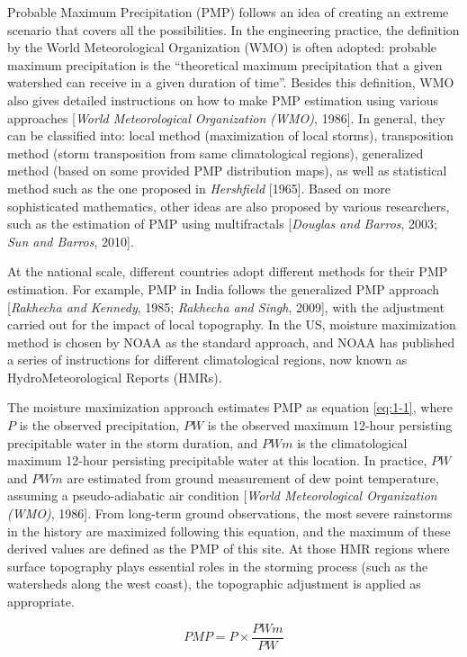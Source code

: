 Probable Maximum Precipitation (PMP) follows an idea of creating an extreme scenario that covers all the possibilities. In the engineering practice, the definition by the World Meteorological Organization (WMO) is often adopted: probable maximum precipitation is the ``theoretical maximum precipitation that a given watershed can receive in a given duration of time''. Besides this definition, WMO also gives detailed instructions on how to make PMP estimation using various approaches [\textit{World Meteorological Organization (WMO)}, 1986]. In general, they can be classified into: local method (maximization of local storms), transposition method (storm transposition from same climatological regions), generalized method (based on some provided PMP distribution maps), as well as statistical method such as the one proposed in \textit{Hershfield} [1965]. Based on more sophisticated mathematics, other ideas are also proposed by various researchers, such as the estimation of PMP using multifractals [\textit{Douglas and Barros}, 2003; \textit{Sun and Barros}, 2010]. 

At the national scale, different countries adopt different methods for their PMP estimation. For example, PMP in India follows the generalized PMP approach [\textit{Rakhecha and Kennedy}, 1985; \textit{Rakhecha and Singh}, 2009], with the adjustment carried out for the impact of local topography. In the US, moisture maximization method is chosen by NOAA as the standard approach, and NOAA has published a series of instructions for different climatological regions, now known as HydroMeteorological Reports (HMRs).

The moisture maximization approach estimates PMP as equation \ref{eq:1-1}, where $P$ is the observed precipitation, $PW$ is the observed maximum 12-hour persisting precipitable water in the storm duration, and $PWm$ is the climatological maximum 12-hour persisting precipitable water at this location. In practice, $PW$ and $PWm$ are estimated from ground measurement of dew point temperature, assuming a pseudo-adiabatic air condition [\textit{World Meteorological Organization (WMO)}, 1986]. From long-term ground observations, the most severe rainstorms in the history are maximized following this equation, and the maximum of these derived values are defined as the PMP of this site. At those HMR regions where surface topography plays essential roles in the storming process (such as the watersheds along the west coast), the topographic adjustment is applied as appropriate.

\begin{equation}
	PMP = P \times{\frac{PWm}{PW}}
	\label{eq:1-1}
\end{equation}

